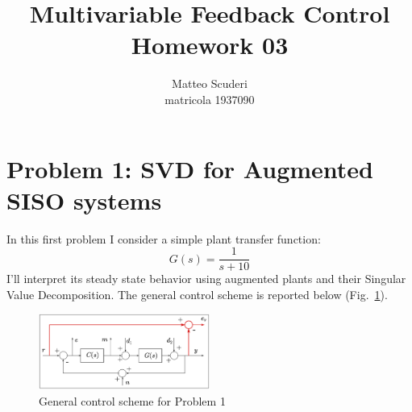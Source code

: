 \documentclass[a4paper, 12pt]{article}
\title{Multivariable Feedback Control \\ Homework 03}
\author{Matteo Scuderi\\ matricola 1937090}
\date{}
\def\FigureOne{\centering\includegraphics[width=0.5\textwidth]{Figures/fig01.pdf}}
\begin{document}
\maketitle

\section{Problem 1: SVD for Augmented SISO systems}
In this first problem I consider a simple plant transfer function:
\begin{equation}
        G(s) = \frac{1}{s+10}
\label{eq:Model}
\end{equation}
I'll interpret its steady state behavior using augmented plants and their Singular Value Decomposition. The general control scheme is reported below (Fig.~\ref{fig:fig01}).
\begin{figure}[h!]
    \FigureOne
    \caption{General control scheme for Problem 1}
    \label{fig:fig01}
\end{figure}
\end{document}
